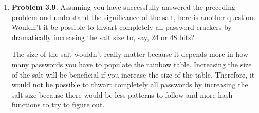 \documentclass[12pt]{article}
\begin{document}
\begin{enumerate}
	
	\vspace{10pt}
	\item {\textbf{Problem 3.9}. Assuming you have successfully answered the preceding problem and understand the significance of the salt, here is another question. Wouldn't it be possible to thwart completely all password crackers by dramatically increasing the salt size to, say, 24 or 48 bits?}
	
	The size of the salt wouldn't really matter because it depends more in how many passwords you have to populate the rainbow table. Increasing the size of the salt will be beneficial if you increase the size of the table. Therefore, it would not be possible to thwart completely all passwords by increasing the salt size because there would be less patterns to follow and more hash functions to try to figure out.
	
		\vspace{10pt}

    
\end{enumerate}
\end{document}
